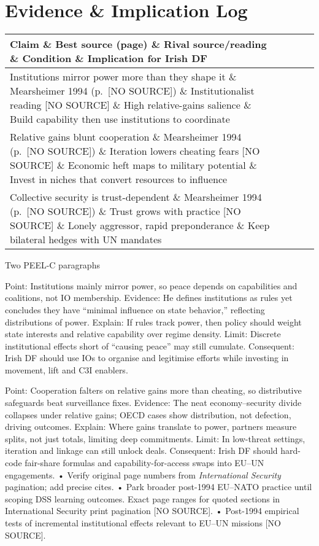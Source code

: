 \section*{Evidence \& Implication Log}
\begin{tabular}{p{3.2cm}p{4.2cm}p{3.6cm}p{3.2cm}p{4.2cm}}
	\textbf{Claim} \& \textbf{Best source (page)} \& \textbf{Rival source/reading} \& \textbf{Condition} \& \textbf{Implication for Irish DF}\\\hline
	Institutions mirror power more than they shape it \& Mearsheimer 1994 (p.~[NO SOURCE]) \& Institutionalist reading [NO SOURCE] \& High relative-gains salience \& Build capability then use institutions to coordinate \\
	Relative gains blunt cooperation \& Mearsheimer 1994 (p.~[NO SOURCE]) \& Iteration lowers cheating fears [NO SOURCE] \& Economic heft maps to military potential \& Invest in niches that convert resources to influence \\
	Collective security is trust-dependent \& Mearsheimer 1994 (p.~[NO SOURCE]) \& Trust grows with practice [NO SOURCE] \& Lonely aggressor, rapid preponderance \& Keep bilateral hedges with UN mandates \\
\end{tabular}

Two PEEL-C paragraphs

Point: Institutions mainly mirror power, so peace depends on capabilities and coalitions, not IO membership.
Evidence: He defines institutions as rules yet concludes they have “minimal influence on state behavior,” reflecting distributions of power.
Explain: If rules track power, then policy should weight state interests and relative capability over regime density.
Limit: Discrete institutional effects short of “causing peace” may still cumulate.
Consequent: Irish DF should use IOs to organise and legitimise efforts while investing in movement, lift and C3I enablers.

Point: Cooperation falters on relative gains more than cheating, so distributive safeguards beat surveillance fixes.
Evidence: The neat economy–security divide collapses under relative gains; OECD cases show distribution, not defection, driving outcomes.
Explain: Where gains translate to power, partners measure splits, not just totals, limiting deep commitments.
Limit: In low-threat settings, iteration and linkage can still unlock deals.
Consequent: Irish DF should hard-code fair-share formulas and capability-for-access swaps into EU–UN engagements.
• Verify original page numbers from \textit{International Security} pagination; add precise cites.
• Park broader post-1994 EU–NATO practice until scoping DSS learning outcomes.
Exact page ranges for quoted sections in International Security print pagination [NO SOURCE].
• Post-1994 empirical tests of incremental institutional effects relevant to EU–UN missions [NO SOURCE].


